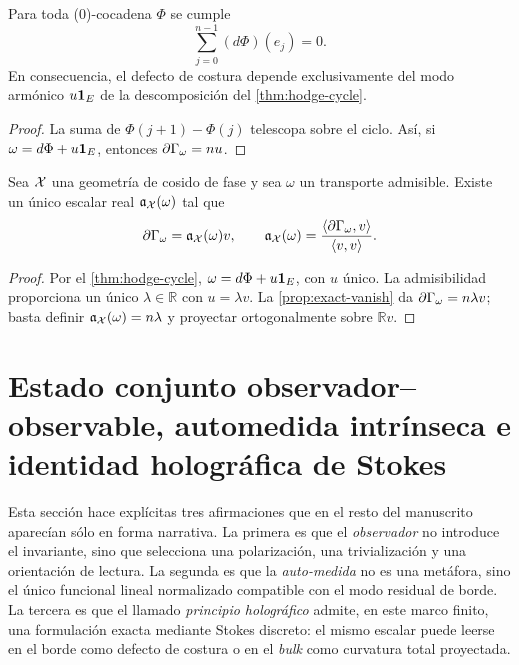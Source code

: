 \begin{proposition}
\label{prop:exact-vanish}
Para toda (0)-cocadena \(\Phi\) se cumple
\[
 \sum_{j=0}^{n-1}(d\Phi)(e_j)=0.
\]
En consecuencia, el defecto de costura depende exclusivamente del modo
armónico \(u\mathbf 1_E\) de la descomposición del
\cref{thm:hodge-cycle}.
\end{proposition}

\begin{proof}
La suma de \(\Phi(j+1)-\Phi(j)\) telescopa sobre el ciclo. Así, si
\(\omega=d\Phi+u\mathbf 1_E\), entonces
\(\partial\Gamma_\omega=nu\).
\end{proof}

\begin{theorem}
\label{thm:universal-sewing}
Sea \(\mathcal X\) una geometría de cosido de fase y sea \(\omega\) un transporte
admisible. Existe un único escalar real \(\mathfrak a_\mathcal X(\omega)\) tal que
\[
 \partial\Gamma_\omega=\mathfrak a_\mathcal X(\omega)v,
 \qquad
 \mathfrak a_\mathcal X(\omega)
 =\frac{\langle\partial\Gamma_\omega,v\rangle}{\langle v,v\rangle}.
\]
\end{theorem}

\begin{proof}
Por el \cref{thm:hodge-cycle}, \(\omega=d\Phi+u\mathbf 1_E\), con \(u\) único.
La admisibilidad proporciona un único \(\lambda\in\mathbb R\) con
\(u=\lambda v\). La \cref{prop:exact-vanish} da
\(\partial\Gamma_\omega=n\lambda v\); basta definir
\(\mathfrak a_\mathcal X(\omega)=n\lambda\) y proyectar ortogonalmente sobre
\(\mathbb Rv\).
\end{proof}

\section{Estado conjunto observador--observable, automedida intrínseca e identidad holográfica de Stokes}\label{sec:observer-holo}

Esta sección hace explícitas tres afirmaciones que en el resto del manuscrito aparecían
sólo en forma narrativa. La primera es que el \emph{observador} no introduce el invariante,
sino que selecciona una polarización, una trivialización y una orientación de lectura.
La segunda es que la \emph{auto-medida} no es una metáfora, sino el único funcional lineal
normalizado compatible con el modo residual de borde. La tercera es que el llamado
\emph{principio holográfico} admite, en este marco finito, una formulación exacta mediante
Stokes discreto: el mismo escalar puede leerse en el borde como defecto de costura o en el
\emph{bulk} como curvatura total proyectada.

